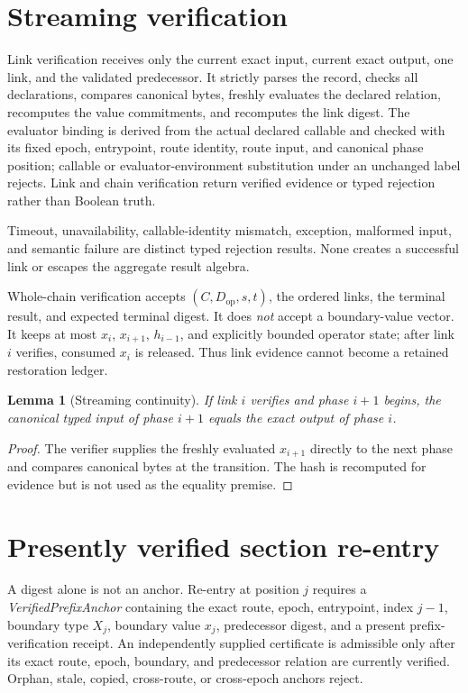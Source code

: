 \documentclass[11pt,letterpaper]{article}
\newtheorem{lemma}[theorem]{Lemma}
\theoremstyle{definition}
\begin{document}
\section{Streaming verification}

Link verification receives only the current exact input, current exact output,
one link, and the validated predecessor.  It strictly parses the record,
checks all declarations, compares canonical bytes, freshly evaluates the
declared relation, recomputes the value commitments, and recomputes the link
digest.  The evaluator binding is derived from the actual declared callable
and checked with its fixed epoch, entrypoint, route identity, route input, and
canonical phase position; callable or evaluator-environment substitution under
an unchanged label rejects.  Link and chain verification
return verified evidence or typed rejection rather than Boolean truth.

Timeout, unavailability, callable-identity mismatch, exception, malformed
input, and semantic failure are distinct typed rejection results.  None creates
a successful link or escapes the aggregate result algebra.

Whole-chain verification accepts
$(C,D_{\mathrm{op}},s,t)$, the ordered links, the terminal result, and expected
terminal digest.  It does \emph{not} accept a boundary-value vector.  It keeps
at most $x_i$, $x_{i+1}$, $h_{i-1}$, and explicitly bounded operator state;
after link $i$ verifies, consumed $x_i$ is released.  Thus link evidence
cannot become a retained restoration ledger.

\begin{lemma}[Streaming continuity]
If link $i$ verifies and phase $i+1$ begins, the canonical typed input of phase
$i+1$ equals the exact output of phase $i$.
\end{lemma}
\begin{proof}
The verifier supplies the freshly evaluated $x_{i+1}$ directly to the next
phase and compares canonical bytes at the transition.  The hash is recomputed
for evidence but is not used as the equality premise.
\end{proof}

\section{Presently verified section re-entry}

A digest alone is not an anchor.  Re-entry at position $j$ requires a
\emph{VerifiedPrefixAnchor} containing the exact route, epoch, entrypoint,
index $j-1$, boundary type $X_j$, boundary value $x_j$, predecessor digest,
and a present prefix-verification receipt.  An independently supplied
certificate is admissible only after its exact route, epoch, boundary, and
predecessor relation are currently verified.  Orphan, stale, copied,
cross-route, or cross-epoch anchors reject.
\end{document}
